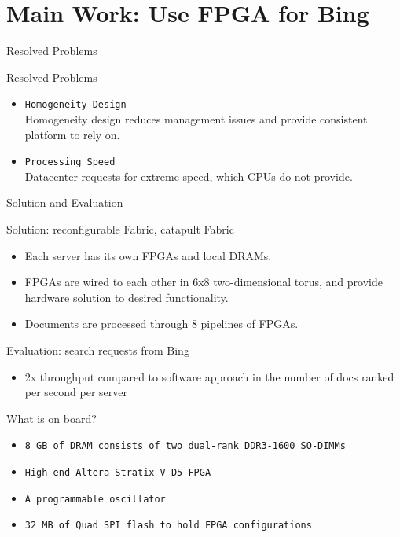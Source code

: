 \documentclass[t]{beamer}
\begin{document}
\section{Main Work: Use FPGA for Bing}
\begin{frame}{Resolved Problems}
    \begin{block}{Resolved Problems}
        \begin{itemize}
            \item {\tt{Homogeneity Design}} \\
            Homogeneity design reduces management issues and provide consistent platform to
            rely on.
            \item {\tt{Processing Speed}} \\
            Datacenter requests for extreme speed, which CPUs do not provide. 
        \end{itemize}
    \end{block}
\end{frame}

\begin{frame}{Solution and Evaluation}
    \begin{block}{Solution: reconfigurable Fabric, catapult Fabric}
        \begin{itemize}
            \item Each server has its own FPGAs and local DRAMs. 
            \item FPGAs are wired to each other in 6x8 two-dimensional torus, and provide hardware
            solution to desired functionality.
            \item Documents are processed through 8 pipelines of FPGAs.
        \end{itemize}
    \end{block}

    \begin{block}{Evaluation: search requests from Bing}
        \begin{itemize}
            \item 2x throughput compared to software approach in the number of docs ranked per
            second per server
        \end{itemize}
    \end{block}
\end{frame}

\begin{frame}{What is on board?}
    \begin{itemize}
        \item {\tt{8 GB of DRAM consists of two dual-rank DDR3-1600 SO-DIMMs}}
        \item {\tt{High-end Altera Stratix V D5 FPGA}}
        \item {\tt{A programmable oscillator}}
        \item {\tt{32 MB of Quad SPI flash to hold FPGA configurations}}
    \end{itemize}
\end{frame}
\end{document}
